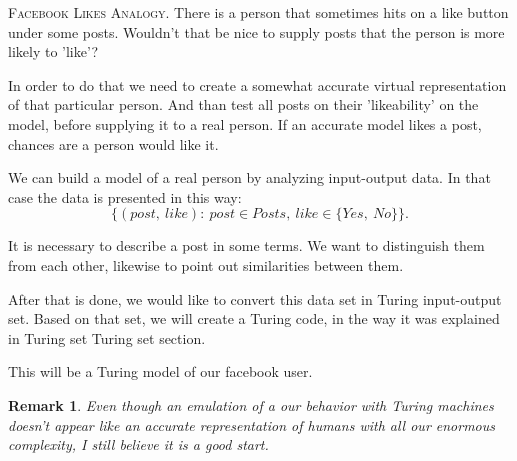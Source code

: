 \documentclass[12pt]{article}
\newcommand\tab[1][-1em]{\hspace*{#1}}
\newtheorem*{remark}{Remark}
\begin{document}
\vspace{5mm}
\begin{addmargin}[3em]{3em}
\tab
\textsc{Facebook Likes Analogy.} There is a person that sometimes hits on a like button under some posts. Wouldn't that be nice to supply posts that the person is more likely to 'like'?

In order to do that we need to create a somewhat accurate virtual representation of that particular person. And than test all posts on their 'likeability' on the model, before supplying it to a real person. If an accurate model likes a post, chances are a person would like it.

We can build a model of a real person by analyzing input-output data. In that case the data is presented in this way: $$\{(post,\ like):\ post\in Posts,\ like\in\{Yes,\ No\}\}.$$

It is necessary to describe a post in some terms. We want to distinguish them from each other, likewise to point out similarities between them.

After that is done, we would like to convert this data set in Turing input-output set. Based on that set, we will create a Turing code, in the way it was explained in Turing set \textsf{Turing set} section.

This will be a Turing model of our facebook user. 
\end{addmargin}

\begin{remark}
Even though an emulation of a our behavior with Turing machines doesn't appear like an accurate representation of humans with all our enormous complexity, I still believe it is a good start.
\end{remark}


\end{document}
